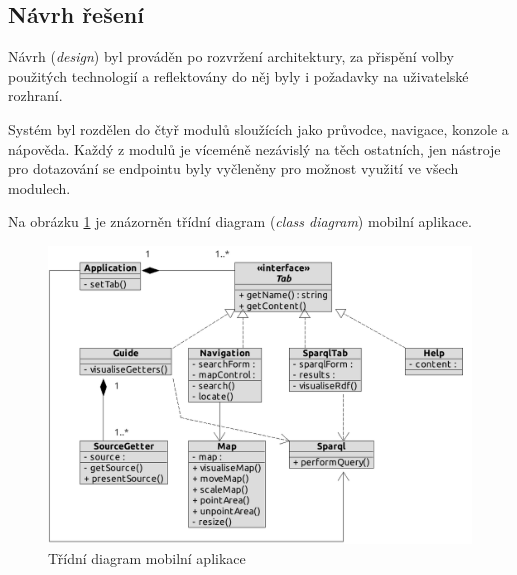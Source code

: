 \subsection{Návrh řešení}
Návrh (\textit{design}) byl prováděn po rozvržení architektury, za přispění volby použitých technologií a reflektovány do něj byly i požadavky na uživatelské rozhraní.

Systém byl rozdělen do čtyř modulů sloužících jako průvodce, navigace,  konzole a nápověda. Každý z modulů je víceméně nezávislý na těch ostatních, jen nástroje pro dotazování se  endpointu byly vyčleněny pro možnost využití ve všech modulech.

Na obrázku \ref{fig:mobile:class} je znázorněn třídní diagram (\textit{class diagram}) mobilní aplikace.

\begin{figure}[h]
 \centering
 \includegraphics[width=14.30cm]{./figures/class-m.pdf}
 \caption{Třídní diagram mobilní aplikace}
 \label{fig:mobile:class}
\end{figure}



